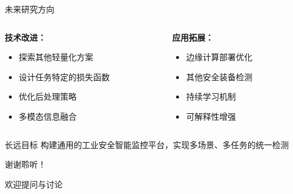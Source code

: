 \documentclass[aspectratio=169]{beamer}
\begin{document}
\begin{frame}{未来研究方向}
    \begin{columns}
        \begin{column}{0.5\textwidth}
            \textbf{技术改进：}
            \begin{itemize}
                \item 探索其他轻量化方案
                \item 设计任务特定的损失函数
                \item 优化后处理策略
                \item 多模态信息融合
            \end{itemize}
        \end{column}
        \begin{column}{0.5\textwidth}
            \textbf{应用拓展：}
            \begin{itemize}
                \item 边缘计算部署优化
                \item 其他安全装备检测
                \item 持续学习机制
                \item 可解释性增强
            \end{itemize}
        \end{column}
    \end{columns}
    
    \vspace{0.5cm}
    \begin{block}{长远目标}
        构建通用的工业安全智能监控平台，实现多场景、多任务的统一检测
    \end{block}
\end{frame}

\begin{frame}
    \begin{center}
        \Huge 谢谢聆听！

        \vspace{1cm}
        \Large 欢迎提问与讨论
    \end{center}
\end{frame}
\end{document}
